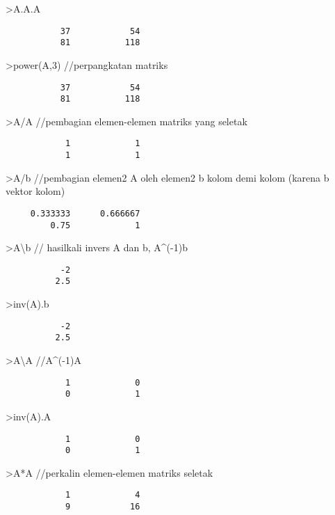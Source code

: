 \documentclass[
]{book}
\begin{document}
\textgreater A.A.A

\begin{verbatim}
           37            54 
           81           118 
\end{verbatim}

\textgreater power(A,3) //perpangkatan matriks

\begin{verbatim}
           37            54 
           81           118 
\end{verbatim}

\textgreater A/A //pembagian elemen-elemen matriks yang seletak

\begin{verbatim}
            1             1 
            1             1 
\end{verbatim}

\textgreater A/b //pembagian elemen2 A oleh elemen2 b kolom demi kolom (karena b vektor kolom)

\begin{verbatim}
     0.333333      0.666667 
         0.75             1 
\end{verbatim}

\textgreater A\textbackslash b // hasilkali invers A dan b, A\^{}(-1)b

\begin{verbatim}
           -2 
          2.5 
\end{verbatim}

\textgreater inv(A).b

\begin{verbatim}
           -2 
          2.5 
\end{verbatim}

\textgreater A\textbackslash A //A\^{}(-1)A

\begin{verbatim}
            1             0 
            0             1 
\end{verbatim}

\textgreater inv(A).A

\begin{verbatim}
            1             0 
            0             1 
\end{verbatim}

\textgreater A*A //perkalin elemen-elemen matriks seletak

\begin{verbatim}
            1             4 
            9            16 
\end{verbatim}
\end{document}
